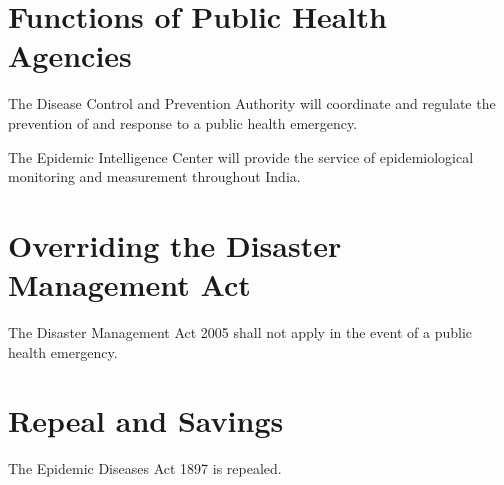 \documentclass{indiabill}
\begin{document}
\section{Functions of Public Health Agencies}
	\begin{numstat}
	\item The Disease Control and Prevention Authority will coordinate and regulate the prevention of and response to a public health emergency. 
	\item The Epidemic Intelligence Center will provide the service of epidemiological monitoring and measurement throughout India.
	\end{numstat}

\section{Overriding the Disaster Management Act}
	\begin{numstat}
	\item The Disaster Management Act 2005 shall not apply in the event of a public health emergency.
	\end{numstat}

\section{Repeal and Savings}
	\begin{numstat}
	\item The Epidemic Diseases Act 1897 is repealed.
	\end{numstat}
\end{document}
